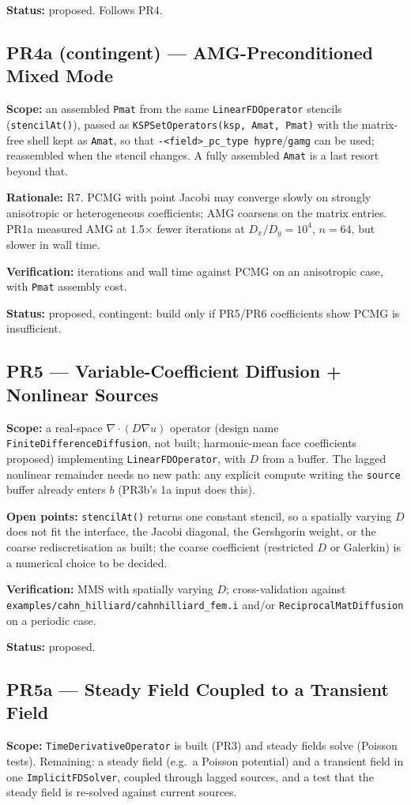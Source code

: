 \documentclass[11pt]{article}
\newcommand{\pr}[2]{\subsection{PR#1 --- #2}}
\newcommand{\status}[1]{\textcolor{marlinteal}{\textbf{Status:}} #1}
\begin{document}
\status{proposed. Follows PR4.}

\pr{4a (contingent)}{AMG-Preconditioned Mixed Mode}
\textbf{Scope:} an assembled \texttt{Pmat} from the same
\texttt{LinearFDOperator} stencils (\texttt{stencilAt()}), passed as
\texttt{KSPSetOperators(ksp, Amat, Pmat)} with the matrix-free shell kept as
\texttt{Amat}, so that \texttt{-<field>\_pc\_type hypre}/\texttt{gamg} can
be used; reassembled when the stencil changes. A fully assembled
\texttt{Amat} is a last resort beyond that.

\textbf{Rationale:} R7. PCMG with point Jacobi may converge slowly on
strongly anisotropic or heterogeneous coefficients; AMG coarsens on the
matrix entries. PR1a measured AMG at 1.5$\times$ fewer iterations at
$D_x/D_y = 10^4$, $n=64$, but slower in wall time.

\textbf{Verification:} iterations and wall time against PCMG on an
anisotropic case, with \texttt{Pmat} assembly cost.

\status{proposed, contingent: build only if PR5/PR6 coefficients show PCMG
is insufficient.}

\pr{5}{Variable-Coefficient Diffusion + Nonlinear Sources}
\textbf{Scope:} a real-space $\nabla\cdot(D\nabla u)$ operator
(design name \texttt{FiniteDifferenceDiffusion}, not built; harmonic-mean
face coefficients proposed) implementing \texttt{LinearFDOperator}, with
$D$ from a buffer. The lagged nonlinear remainder needs no new path: any
explicit compute writing the \texttt{source} buffer already enters $b$
(PR3b's 1a input does this).

\textbf{Open points:} \texttt{stencilAt()} returns one constant stencil, so
a spatially varying $D$ does not fit the interface, the Jacobi diagonal, the
Gershgorin weight, or the coarse rediscretisation as built; the coarse
coefficient (restricted $D$ or Galerkin) is a numerical choice to be
decided.

\textbf{Verification:} MMS with spatially varying $D$; cross-validation
against \texttt{examples/cahn\_hilliard/cahnhilliard\_fem.i} and/or
\texttt{ReciprocalMatDiffusion} on a periodic case.

\status{proposed.}

\pr{5a}{Steady Field Coupled to a Transient Field}
\textbf{Scope:} \texttt{TimeDerivativeOperator} is built (PR3) and steady
fields solve (Poisson tests). Remaining: a steady field (e.g.\ a Poisson
potential) and a transient field in one \texttt{ImplicitFDSolver}, coupled
through lagged sources, and a test that the steady field is re-solved
against current sources.
\end{document}
